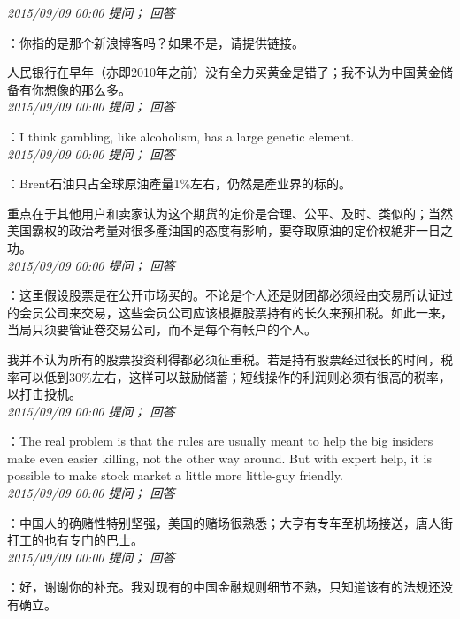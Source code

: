 \documentclass[twocolumn]{ctexart}
\begin{document}
\textit{\hfill\noindent\small 2015/09/09 00:00 提问； 回答}

：你指的是那个新浪博客吗？如果不是，请提供链接。

人民银行在早年（亦即2010年之前）没有全力买黄金是错了；我不认为中国黄金储备有你想像的那么多。\\

\textit{\hfill\noindent\small 2015/09/09 00:00 提问； 回答}

：I think gambling, like alcoholism, has a large genetic element.\\

\textit{\hfill\noindent\small 2015/09/09 00:00 提问； 回答}

：Brent石油只占全球原油產量1\%左右，仍然是產业界的标的。

重点在于其他用户和卖家认为这个期货的定价是合理、公平、及时、类似的；当然美国霸权的政治考量对很多產油国的态度有影响，要夺取原油的定价权絶非一日之功。\\

\textit{\hfill\noindent\small 2015/09/09 00:00 提问； 回答}

：这里假设股票是在公开市场买的。不论是个人还是财团都必须经由交易所认证过的会员公司来交易，这些会员公司应该根据股票持有的长久来预扣税。如此一来，当局只须要管证卷交易公司，而不是每个有帐户的个人。

我并不认为所有的股票投资利得都必须征重税。若是持有股票经过很长的时间，税率可以低到30\%左右，这样可以鼓励储蓄；短线操作的利润则必须有很高的税率，以打击投机。\\

\textit{\hfill\noindent\small 2015/09/09 00:00 提问； 回答}

：The real problem is that the rules are usually meant to help the big insiders make even easier killing, not the other way around. But with expert help, it is possible to make stock market a little more little-guy friendly.\\

\textit{\hfill\noindent\small 2015/09/09 00:00 提问； 回答}

：中国人的确赌性特别坚强，美国的赌场很熟悉；大亨有专车至机场接送，唐人街打工的也有专门的巴士。\\

\textit{\hfill\noindent\small 2015/09/09 00:00 提问； 回答}

：好，谢谢你的补充。我对现有的中国金融规则细节不熟，只知道该有的法规还没有确立。\\
\end{document}
